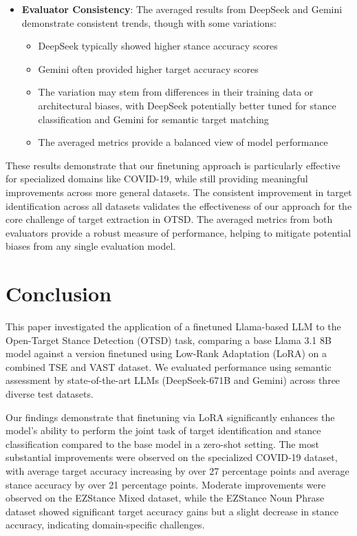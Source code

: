 \documentclass[twocolumn,11pt,letterpaper]{article}
\begin{document}
\begin{itemize}
    \item \textbf{Evaluator Consistency}: The averaged results from DeepSeek and Gemini demonstrate consistent trends, though with some variations:
    \begin{itemize}
        \item DeepSeek typically showed higher stance accuracy scores
        \item Gemini often provided higher target accuracy scores
        \item The variation may stem from differences in their training data or architectural biases, with DeepSeek potentially better tuned for stance classification and Gemini for semantic target matching
        \item The averaged metrics provide a balanced view of model performance
    \end{itemize}
\end{itemize}

These results demonstrate that our finetuning approach is particularly effective for specialized domains like COVID-19, while still providing meaningful improvements across more general datasets. The consistent improvement in target identification across all datasets validates the effectiveness of our approach for the core challenge of target extraction in OTSD. The averaged metrics from both evaluators provide a robust measure of performance, helping to mitigate potential biases from any single evaluation model.

\section{Conclusion}
\label{sec:conclusion}

This paper investigated the application of a finetuned Llama-based LLM to the Open-Target Stance Detection (OTSD) task, comparing a base Llama 3.1 8B model against a version finetuned using Low-Rank Adaptation (LoRA) on a combined TSE and VAST dataset. We evaluated performance using semantic assessment by state-of-the-art LLMs (DeepSeek-671B and Gemini) across three diverse test datasets.

Our findings demonstrate that finetuning via LoRA significantly enhances the model's ability to perform the joint task of target identification and stance classification compared to the base model in a zero-shot setting. The most substantial improvements were observed on the specialized COVID-19 dataset, with average target accuracy increasing by over 27 percentage points and average stance accuracy by over 21 percentage points. Moderate improvements were observed on the EZStance Mixed dataset, while the EZStance Noun Phrase dataset showed significant target accuracy gains but a slight decrease in stance accuracy, indicating domain-specific challenges.
\end{document}
